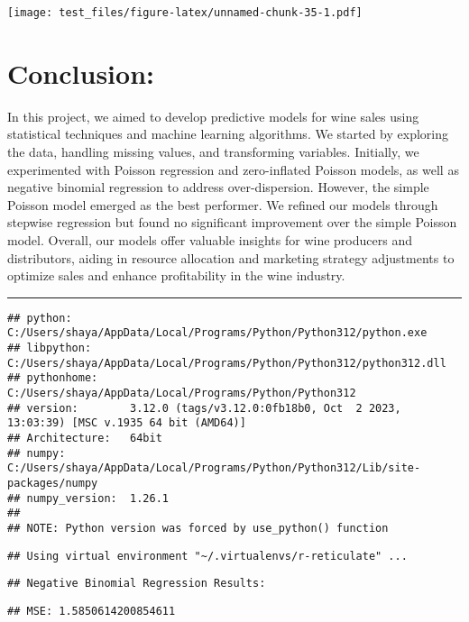 \documentclass[
]{article}
\begin{document}
\texttt{[image: test\_files/figure-latex/unnamed-chunk-35-1.pdf]}

\section{Conclusion:}\label{conclusion}

In this project, we aimed to develop predictive models for wine sales
using statistical techniques and machine learning algorithms. We started
by exploring the data, handling missing values, and transforming
variables. Initially, we experimented with Poisson regression and
zero-inflated Poisson models, as well as negative binomial regression to
address over-dispersion. However, the simple Poisson model emerged as
the best performer. We refined our models through stepwise regression
but found no significant improvement over the simple Poisson model.
Overall, our models offer valuable insights for wine producers and
distributors, aiding in resource allocation and marketing strategy
adjustments to optimize sales and enhance profitability in the wine
industry.

\begin{center}\rule{0.5\linewidth}{0.5pt}\end{center}

\begin{verbatim}
## python:         C:/Users/shaya/AppData/Local/Programs/Python/Python312/python.exe
## libpython:      C:/Users/shaya/AppData/Local/Programs/Python/Python312/python312.dll
## pythonhome:     C:/Users/shaya/AppData/Local/Programs/Python/Python312
## version:        3.12.0 (tags/v3.12.0:0fb18b0, Oct  2 2023, 13:03:39) [MSC v.1935 64 bit (AMD64)]
## Architecture:   64bit
## numpy:          C:/Users/shaya/AppData/Local/Programs/Python/Python312/Lib/site-packages/numpy
## numpy_version:  1.26.1
## 
## NOTE: Python version was forced by use_python() function
\end{verbatim}

\begin{verbatim}
## Using virtual environment "~/.virtualenvs/r-reticulate" ...
\end{verbatim}

\begin{verbatim}
## Negative Binomial Regression Results:
\end{verbatim}

\begin{verbatim}
## MSE: 1.5850614200854611
\end{verbatim}
\end{document}
